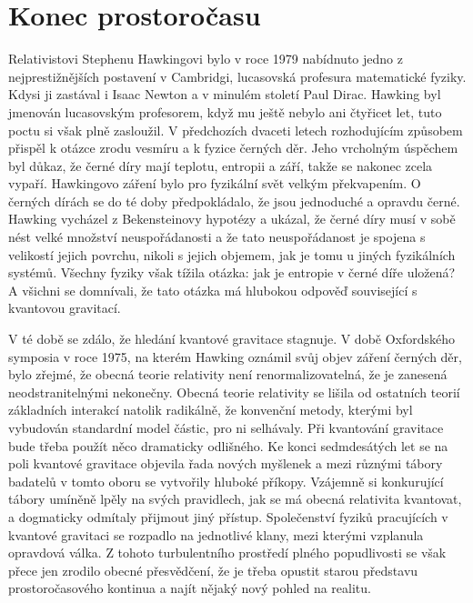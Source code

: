 \section{Konec prostoročasu}\label{kulIchIIIsecXIII}
  Relativistovi Stephenu Hawkingovi bylo v roce 1979 nabídnuto jedno z nejprestižnějších postavení v
  Cambridgi, lucasovská profesura matematické fyziky. Kdysi ji zastával i Isaac Newton a v minulém
  století Paul Dirac. Hawking byl jmenován lucasovským profesorem, když mu ještě nebylo ani čtyřicet
  let, tuto poctu si však plně zasloužil. V předchozích dvaceti letech rozhodujícím způsobem přispěl
  k otázce zrodu vesmíru a k fyzice černých děr. Jeho vrcholným úspěchem byl důkaz, že černé díry
  mají teplotu, entropii a září, takže se nakonec zcela vypaří. Hawkingovo záření bylo pro fyzikální
  svět velkým překvapením. O černých dírách se do té doby předpokládalo, že jsou jednoduché a
  opravdu černé. Hawking vycházel z Bekensteinovy hypotézy a ukázal, že černé díry musí v sobě nést
  velké množství neuspořádanosti a že tato neuspořádanost je spojena s velikostí jejich povrchu,
  nikoli s jejich objemem, jak je tomu u jiných fyzikálních systémů. Všechny fyziky však tížila
  otázka: jak je entropie v černé díře uložená? A všichni se domnívali, že tato otázka má hlubokou
  odpověď související s kvantovou gravitací. 
  
  V té době se zdálo, že hledání kvantové gravitace stagnuje. V době Oxfordského symposia v roce
  1975, na kterém Hawking oznámil svůj objev záření černých děr, bylo zřejmé, že obecná teorie
  relativity není renormalizovatelná, že je zanesená neodstranitelnými nekonečny. Obecná teorie
  relativity se lišila od ostatních teorií základních interakcí natolik radikálně, že konvenční
  metody, kterými byl vybudován standardní model částic, pro ni selhávaly. Při kvantování gravitace
  bude třeba použít něco dramaticky odlišného. Ke konci sedmdesátých let se na poli kvantové
  gravitace objevila řada nových myšlenek a mezi různými tábory badatelů v tomto oboru se vytvořily
  hluboké příkopy. Vzájemně si konkurující tábory umíněně lpěly na svých pravidlech, jak se má
  obecná relativita kvantovat, a dogmaticky odmítaly přijmout jiný přístup. Společenství fyziků
  pracujících v kvantové gravitaci se rozpadlo na jednotlivé klany, mezi kterými vzplanula opravdová
  válka. Z tohoto turbulentního prostředí plného popudlivosti se však přece jen zrodilo obecné
  přesvědčení, že je třeba opustit starou představu prostoročasového kontinua a najít nějaký nový
  pohled na realitu. 
  

